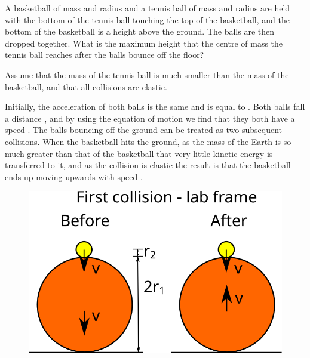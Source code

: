 
\begin{problem}[Superball] 
{A basketball of mass  and radius   and a tennis ball of  mass  and radius  are held with the bottom of the tennis ball touching the top of the basketball, and the bottom of the basketball is a height  above the ground. The balls are then dropped together. What is the maximum height that the centre of mass the tennis ball reaches after the balls bounce off the floor?

Assume that the mass of the tennis ball is much smaller than the mass of the basketball, and that all collisions are elastic.}
{}
{Initially, the acceleration of both balls is the same and is equal to . Both balls fall a distance , and by using the equation of motion  we find that they both have a speed . The balls bouncing off the ground can be treated as two subsequent collisions. When the basketball hits the ground, as the mass of the Earth is so much greater than that of the basketball that very little kinetic energy is transferred to it, and as the collision is elastic the result is that the basketball ends up moving upwards with speed .

\begin{figure}[h]
\centering
\includegraphics[width=1.0\textwidth]{../../../figures/dynamics_tennis_basket_ball_first.svg}
\caption{}\label{fig:dynamics_tennis_basket_first}
\end{figure}

}
\end{problem}
